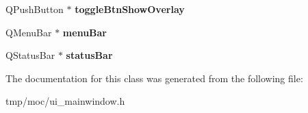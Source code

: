 \begin{DoxyCompactItemize}
\item 
Q\+Push\+Button $\ast$ {\bfseries toggle\+Btn\+Show\+Overlay}\hypertarget{class_ui___main_window_a550e65cd07cfa9c1fd1f3f2bc000701c}{}\label{class_ui___main_window_a550e65cd07cfa9c1fd1f3f2bc000701c}

\item 
Q\+Menu\+Bar $\ast$ {\bfseries menu\+Bar}\hypertarget{class_ui___main_window_a2be1c24ec9adfca18e1dcc951931457f}{}\label{class_ui___main_window_a2be1c24ec9adfca18e1dcc951931457f}

\item 
Q\+Status\+Bar $\ast$ {\bfseries status\+Bar}\hypertarget{class_ui___main_window_a50fa481337604bcc8bf68de18ab16ecd}{}\label{class_ui___main_window_a50fa481337604bcc8bf68de18ab16ecd}

\end{DoxyCompactItemize}


The documentation for this class was generated from the following file\+:\begin{DoxyCompactItemize}
\item 
tmp/moc/ui\+\_\+mainwindow.\+h\end{DoxyCompactItemize}
